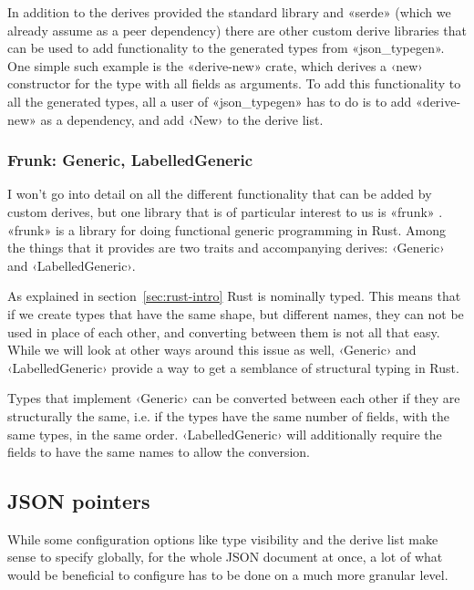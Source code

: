 In addition to the derives provided the standard library and «serde»  (which we already assume as a peer dependency) there are other custom derive libraries that can be used to add functionality to the generated types from «json_typegen». One simple such example is the «derive-new» crate, which derives a ‹new› constructor for the type with all fields as arguments. To add this functionality to all the generated types, all a user of «json_typegen» has to do is to add «derive-new» as a dependency, and add ‹New› to the derive list.

\subsubsection{Frunk: Generic, LabelledGeneric}

I won't go into detail on all the different functionality that can be added by custom derives, but one library that is of particular interest to us is «frunk» \cite{frunk}. «frunk» is a library for doing functional generic programming in Rust. Among the things that it provides are two traits and accompanying derives: ‹Generic› and ‹LabelledGeneric›.


As explained in section~\ref{sec:rust-intro} Rust is nominally typed. This means that if we create types that have the same shape, but different names, they can not be used in place of each other, and converting between them is not all that easy. While we will look at other ways around this issue as well, ‹Generic› and ‹LabelledGeneric› provide a way to get a semblance of structural typing in Rust.

Types that implement ‹Generic› can be converted between each other if they are structurally the same, i.e. if the types have the same number of fields, with the same types, in the same order. ‹LabelledGeneric› will additionally require the fields to have the same names to allow the conversion.

\subsection{JSON pointers}
\label{sec:json-pointers}

While some configuration options like type visibility and the derive list make sense to specify globally, for the whole JSON document at once, a lot of what would be beneficial to configure has to be done on a much more granular level.

